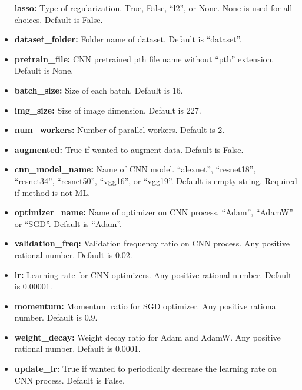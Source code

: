 \begin{itemize}
  \textbf{lasso:} Type of regularization. True, False, ``l2'', or None. None is
  used for all choices. Default is False.\\
\item
  \textbf{dataset\_folder:} Folder name of dataset. Default is ``dataset''.\\
\item
  \textbf{pretrain\_file:} CNN pretrained pth file name without ``pth''
  extension. Default is None.\\
\item
  \textbf{batch\_size:} Size of each batch. Default is 16.\\
\item
  \textbf{img\_size:} Size of image dimension. Default is 227.\\
\item
  \textbf{num\_workers:} Number of parallel workers. Default is 2.\\
\item
  \textbf{augmented:} True if wanted to augment data. Default is False.\\
\item
  \textbf{cnn\_model\_name:} Name of CNN model. ``alexnet'', ``resnet18'',
  ``resnet34'', ``resnet50'', ``vgg16'', or ``vgg19''. Default is empty
  string. Required if method is not ML.\\
\item
  \textbf{optimizer\_name:} Name of optimizer on CNN process. ``Adam'', ``AdamW''
  or ``SGD''. Default is ``Adam''.\\
\item
  \textbf{validation\_freq:} Validation frequency ratio on CNN process. Any
  positive rational number. Default is 0.02.\\
\item
  \textbf{lr:} Learning rate for CNN optimizers. Any positive rational number.
  Default is 0.00001.\\
\item
  \textbf{momentum:} Momentum ratio for SGD optimizer. Any positive rational
  number. Default is 0.9.\\
\item
  \textbf{weight\_decay:} Weight decay ratio for Adam and AdamW. Any positive
  rational number. Default is 0.0001.\\
\item
  \textbf{update\_lr:} True if wanted to periodically decrease the learning rate
  on CNN process. Default is False.\\

\end{itemize}
